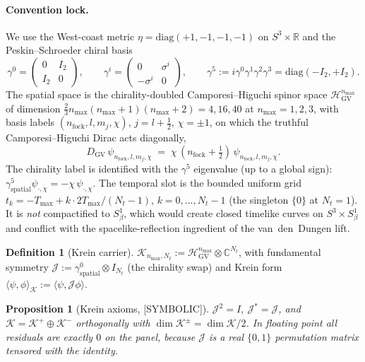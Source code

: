 \documentclass[11pt,a4paper]{article}
\theoremstyle{plain}
\newtheorem{proposition}[theorem]{Proposition}
\theoremstyle{definition}
\newtheorem{definition}[theorem]{Definition}
\newcommand{\nmax}{n_{\max}}
\newcommand{\sthree}{S^{3}}
\newcommand{\Hilb}{\mathcal{H}}
\newcommand{\R}{\mathbb{R}}
\newcommand{\C}{\mathbb{C}}
\newcommand{\Krein}{\mathcal{K}}
\newcommand{\Nt}{N_t}
\newcommand{\DGV}{D_{\mathrm{GV}}}
\begin{document}
\paragraph{Convention lock.}
We use the West-coast metric $\eta = \mathrm{diag}(+1, -1, -1, -1)$ on
$\sthree \times \R$ and the Peskin--Schroeder chiral basis
\begin{equation}\label{eq:krein_gamma_chiral}
   \gamma^0 = \begin{pmatrix} 0 & I_2 \\ I_2 & 0 \end{pmatrix},
   \qquad
   \gamma^i = \begin{pmatrix} 0 & \sigma^i \\ -\sigma^i & 0 \end{pmatrix},
   \qquad
   \gamma^5 := i\gamma^0\gamma^1\gamma^2\gamma^3
   = \mathrm{diag}(-I_2, +I_2).
\end{equation}
The spatial space is the chirality-doubled Camporesi--Higuchi spinor
space $\Hilb_{\mathrm{GV}}^{\nmax}$ of dimension
$\tfrac{2}{3}\nmax(\nmax+1)(\nmax+2) = 4, 16, 40$ at $\nmax = 1, 2, 3$,
with basis labels $(n_{\mathrm{fock}}, l, m_j, \chi)$, $j = l + \tfrac12$,
$\chi = \pm 1$, on which the truthful Camporesi--Higuchi Dirac acts
diagonally,
\begin{equation}\label{eq:krein_DGV}
   \DGV\, \psi_{n_{\mathrm{fock}}, l, m_j, \chi}
   \;=\; \chi\,(n_{\mathrm{fock}} + \tfrac12)\,
   \psi_{n_{\mathrm{fock}}, l, m_j, \chi}.
\end{equation}
The chirality label is identified with the $\gamma^5$ eigenvalue (up to a
global sign):\ $\gamma^5_{\mathrm{spatial}}\psi_{\cdot,\chi} = -\chi\,\psi_{\cdot,\chi}$.
The temporal slot is the bounded uniform grid
$t_k = -T_{\max} + k\cdot 2T_{\max}/(\Nt - 1)$, $k = 0, \ldots, \Nt - 1$
(the singleton $\{0\}$ at $\Nt = 1$).  It is \emph{not} compactified to
$S^1_\beta$, which would create closed timelike curves on
$\sthree \times S^1_\beta$ and conflict with the spacelike-reflection
ingredient of the van~den~Dungen lift.

\begin{definition}[Krein carrier]\label{def:krein_space}
$\Krein_{\nmax, \Nt} := \Hilb_{\mathrm{GV}}^{\nmax} \otimes \C^{\Nt}$,
with fundamental symmetry $\mathcal{J} := \gamma^0_{\mathrm{spatial}}
\otimes I_{\Nt}$ (the chirality swap) and Krein form
$\langle \psi, \phi \rangle_{\Krein} := \langle \psi, \mathcal{J}\phi\rangle$.
\end{definition}

\begin{proposition}[Krein axioms, {[SYMBOLIC]}]\label{prop:krein_axioms}
$\mathcal{J}^2 = I$, $\mathcal{J}^* = \mathcal{J}$, and
$\Krein = \Krein^+ \oplus \Krein^-$ orthogonally with
$\dim\Krein^\pm = \dim\Krein/2$.  In floating point all residuals are
exactly $0$ on the panel, because $\mathcal{J}$ is a real $\{0,1\}$
permutation matrix tensored with the identity.
\end{proposition}
\end{document}
